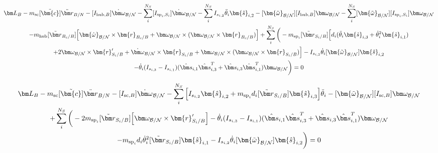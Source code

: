 \documentclass[paper]{aiaaNew}
\begin{document}
\begin{multline}
\bm L_B - m_{\text{sc}}[\tilde{\bm{c}}]\ddot{\bm r}_{B/N} -[I_{\text{hub},B}] \dot{\bm\omega}_{\cal B/N} - \sum\limits_{i}^{N_S}[I_{\text{sp}_i,S_i}] \dot{\bm\omega}_{\cal B/N} - \sum\limits_{i}^{N_S} I_{s_{i,2}}\ddot{\theta}_i \bm{\hat{s}}_{i,2} -[\bm{\tilde{\omega}}_{\cal B/N}] [I_{\text{hub},B}] \bm\omega_{\cal B/N} - \sum\limits_{i}^{N_S}[\bm{\tilde{\omega}}_{\cal B/N}] [I_{\text{sp}_i,S_i}] \bm\omega_{\cal B/N} \\- m_{\text{hub}} [\tilde{{\bm r}}_{B_c/B}] \Big[\bm{\dot{\omega}}_{\cal B/N} \times \bm{r}_{B_c/B} + \bm\omega_{\cal B/N} \times (\bm\omega_{\cal B/N} \times \bm{r}_{B_c/B})\Big]
+ \sum\limits_{i}^{N_S}\bigg(- m_{\text{sp}_i} [\tilde{{\bm r}}_{S_{i}/B}] \Big[ d_i (\ddot{\theta}_i \bm{\hat{s}}_{i,3} + \dot{\theta}_i^2 \bm{\hat{s}}_{i,1}) \\
+ 2 \bm\omega_{\cal B/N} \times \bm{r}'_{S_i/B} +  \dot{\bm\omega}_{\cal B/N} \times \bm{r}_{S_i/B}
+ \bm\omega_{\cal B/N} \times (\bm\omega_{\cal B/N} \times \bm{r}_{S_i/B})\Big]
- I_{s_{i,2}} \dot{\theta}_i [\bm{\tilde{\omega}}_{\cal B/N}] \bm{\hat{s}}_{i,2} \\
-\dot{\theta}_i(I_{s_{i,3}}-I_{s_{i,1}})(\hat{\bm s}_{i,1}\hat{\bm s}_{i,3}^{T}+\hat{\bm s}_{i,3}\hat{\bm s}_{i,1}^{T}) \bm\omega_{\cal B/N} \bigg) = 0
\end{multline}

\begin{multline}
\bm L_B - m_{\text{sc}}[\tilde{\bm{c}}]\ddot{\bm r}_{B/N} -[I_{\text{sc},B}] \dot{\bm\omega}_{\cal B/N} - \sum\limits_{i}^{N_S} \Big[I_{s_{i,2}} \bm{\hat{s}}_{i,2} + m_{\text{sp}_i} d_i [\tilde{{\bm r}}_{S_{i}/B}] \bm{\hat{s}}_{i,3}\Big] \ddot{\theta}_i -[\bm{\tilde{\omega}}_{\cal B/N}] [I_{\text{sc},B}] \bm\omega_{\cal B/N} \\
+ \sum\limits_{i}^{N_S}\bigg(- 2 m_{\text{sp}_i} [\tilde{{\bm r}}_{S_{i}/B}] \Big[\bm\omega_{\cal B/N} \times \bm{r}'_{S_i/B}\Big] -\dot{\theta}_i(I_{s_{i,3}}-I_{s_{i,1}})(\hat{\bm s}_{i,1}\hat{\bm s}_{i,3}^{T}+\hat{\bm s}_{i,3}\hat{\bm s}_{i,1}^{T}) \bm\omega_{\cal B/N} \\ 
- m_{\text{sp}_i} d_i \dot{\theta}_i^2 [\tilde{{\bm r}}_{S_{i}/B}]   \bm{\hat{s}}_{i,1}
- I_{s_{i,2}} \dot{\theta}_i [\bm{\tilde{\omega}}_{\cal B/N}] \bm{\hat{s}}_{i,2} \bigg) = 0
\end{multline}
\end{document}
